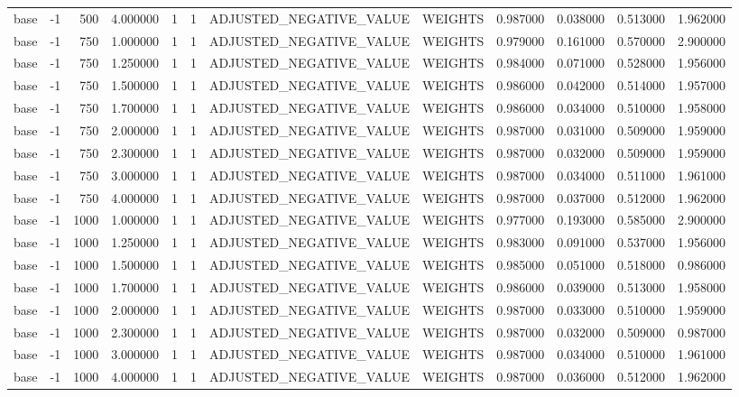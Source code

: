 \begin{tabular}{lrrrllllrrrr}
base & -1 & 500 & 4.000000 & 1 & 1 & ADJUSTED_NEGATIVE_VALUE & WEIGHTS & 0.987000 & 0.038000 & 0.513000 & 1.962000 \\
base & -1 & 750 & 1.000000 & 1 & 1 & ADJUSTED_NEGATIVE_VALUE & WEIGHTS & 0.979000 & 0.161000 & 0.570000 & 2.900000 \\
base & -1 & 750 & 1.250000 & 1 & 1 & ADJUSTED_NEGATIVE_VALUE & WEIGHTS & 0.984000 & 0.071000 & 0.528000 & 1.956000 \\
base & -1 & 750 & 1.500000 & 1 & 1 & ADJUSTED_NEGATIVE_VALUE & WEIGHTS & 0.986000 & 0.042000 & 0.514000 & 1.957000 \\
base & -1 & 750 & 1.700000 & 1 & 1 & ADJUSTED_NEGATIVE_VALUE & WEIGHTS & 0.986000 & 0.034000 & 0.510000 & 1.958000 \\
base & -1 & 750 & 2.000000 & 1 & 1 & ADJUSTED_NEGATIVE_VALUE & WEIGHTS & 0.987000 & 0.031000 & 0.509000 & 1.959000 \\
base & -1 & 750 & 2.300000 & 1 & 1 & ADJUSTED_NEGATIVE_VALUE & WEIGHTS & 0.987000 & 0.032000 & 0.509000 & 1.959000 \\
base & -1 & 750 & 3.000000 & 1 & 1 & ADJUSTED_NEGATIVE_VALUE & WEIGHTS & 0.987000 & 0.034000 & 0.511000 & 1.961000 \\
base & -1 & 750 & 4.000000 & 1 & 1 & ADJUSTED_NEGATIVE_VALUE & WEIGHTS & 0.987000 & 0.037000 & 0.512000 & 1.962000 \\
base & -1 & 1000 & 1.000000 & 1 & 1 & ADJUSTED_NEGATIVE_VALUE & WEIGHTS & 0.977000 & 0.193000 & 0.585000 & 2.900000 \\
base & -1 & 1000 & 1.250000 & 1 & 1 & ADJUSTED_NEGATIVE_VALUE & WEIGHTS & 0.983000 & 0.091000 & 0.537000 & 1.956000 \\
base & -1 & 1000 & 1.500000 & 1 & 1 & ADJUSTED_NEGATIVE_VALUE & WEIGHTS & 0.985000 & 0.051000 & 0.518000 & 0.986000 \\
base & -1 & 1000 & 1.700000 & 1 & 1 & ADJUSTED_NEGATIVE_VALUE & WEIGHTS & 0.986000 & 0.039000 & 0.513000 & 1.958000 \\
base & -1 & 1000 & 2.000000 & 1 & 1 & ADJUSTED_NEGATIVE_VALUE & WEIGHTS & 0.987000 & 0.033000 & 0.510000 & 1.959000 \\
base & -1 & 1000 & 2.300000 & 1 & 1 & ADJUSTED_NEGATIVE_VALUE & WEIGHTS & 0.987000 & 0.032000 & 0.509000 & 0.987000 \\
base & -1 & 1000 & 3.000000 & 1 & 1 & ADJUSTED_NEGATIVE_VALUE & WEIGHTS & 0.987000 & 0.034000 & 0.510000 & 1.961000 \\
base & -1 & 1000 & 4.000000 & 1 & 1 & ADJUSTED_NEGATIVE_VALUE & WEIGHTS & 0.987000 & 0.036000 & 0.512000 & 1.962000 \\

\end{tabular}
